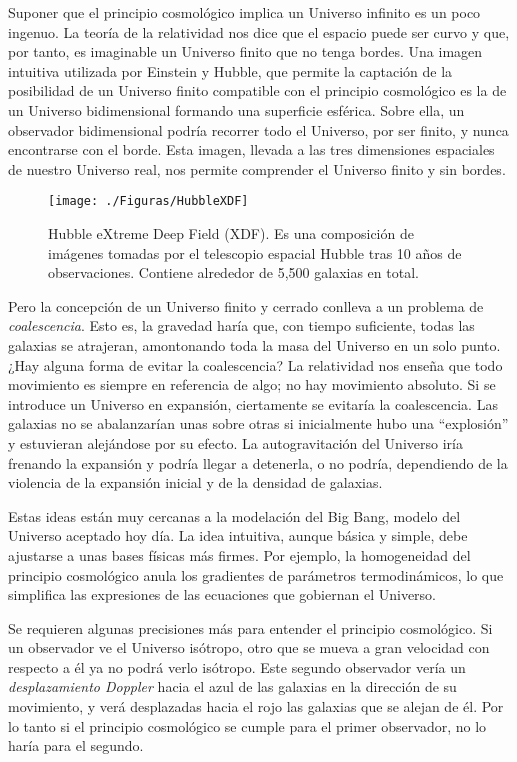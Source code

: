 \documentclass[a4paper,openright,10pt, oneside, final]{book}
\begin{document}
Suponer que el principio cosmológico implica un Universo infinito es un poco ingenuo. La teoría de la relatividad nos dice que el espacio puede ser curvo y que, por tanto, es imaginable un Universo finito que no tenga bordes. Una imagen intuitiva utilizada por Einstein y Hubble, que permite la captación de la posibilidad de un Universo finito compatible con el principio cosmológico es la de un Universo bidimensional formando una superficie esférica. Sobre ella, un observador bidimensional podría recorrer todo el Universo, por ser finito, y nunca encontrarse con el borde. Esta imagen, llevada a las tres dimensiones espaciales de nuestro Universo real, nos permite comprender el Universo finito y sin bordes.

\begin{figure}
\centering
\texttt{[image: ./Figuras/HubbleXDF]}
\caption{\footnotesize{Hubble eXtreme Deep Field (XDF). Es una composición de imágenes tomadas por el telescopio espacial Hubble tras 10 años de observaciones. Contiene alrededor de 5,500 galaxias en total.}}
\end{figure}

Pero la concepción de un Universo finito y cerrado conlleva a un problema de \textit{coalescencia}. Esto es, la gravedad haría que, con tiempo suficiente, todas las galaxias se atrajeran, amontonando toda la masa del Universo en un solo punto. ¿Hay alguna forma de evitar la coalescencia? La relatividad nos enseña que todo movimiento es siempre en referencia de algo; no hay movimiento absoluto. Si se introduce un Universo en expansión, ciertamente se evitaría la coalescencia. Las galaxias no se abalanzarían unas sobre otras si inicialmente hubo una ``explosión'' y estuvieran alejándose por su efecto. La autogravitación del Universo iría frenando la expansión y podría llegar a detenerla, o no podría, dependiendo de la violencia de la expansión inicial y de la densidad de galaxias.

Estas ideas están muy cercanas a la modelación del Big Bang, modelo del Universo aceptado hoy día. La idea intuitiva, aunque básica y simple, debe ajustarse a unas bases físicas más firmes. Por ejemplo, la homogeneidad del principio cosmológico anula los gradientes de parámetros termodinámicos, lo que simplifica las expresiones de las ecuaciones que gobiernan el Universo.

Se requieren algunas precisiones más para entender el principio cosmológico. Si un observador ve el Universo isótropo, otro que se mueva a gran velocidad con respecto a él ya no podrá verlo isótropo. Este segundo observador vería un \textit{desplazamiento Doppler} hacia el azul de las galaxias en la dirección de su movimiento, y verá desplazadas hacia el rojo las galaxias que se alejan de él. Por lo tanto si el principio cosmológico se cumple para el primer observador, no lo haría para el segundo.
\end{document}
